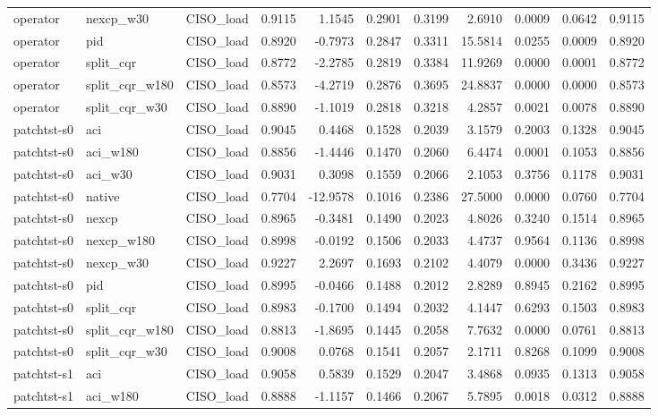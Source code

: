\begin{tabular}{lllrrrrrrrr}
operator & nexcp_w30 & CISO_load & 0.9115 & 1.1545 & 0.2901 & 0.3199 & 2.6910 & 0.0009 & 0.0642 & 0.9115 \\
operator & pid & CISO_load & 0.8920 & -0.7973 & 0.2847 & 0.3311 & 15.5814 & 0.0255 & 0.0009 & 0.8920 \\
operator & split_cqr & CISO_load & 0.8772 & -2.2785 & 0.2819 & 0.3384 & 11.9269 & 0.0000 & 0.0001 & 0.8772 \\
operator & split_cqr_w180 & CISO_load & 0.8573 & -4.2719 & 0.2876 & 0.3695 & 24.8837 & 0.0000 & 0.0000 & 0.8573 \\
operator & split_cqr_w30 & CISO_load & 0.8890 & -1.1019 & 0.2818 & 0.3218 & 4.2857 & 0.0021 & 0.0078 & 0.8890 \\
patchtst-s0 & aci & CISO_load & 0.9045 & 0.4468 & 0.1528 & 0.2039 & 3.1579 & 0.2003 & 0.1328 & 0.9045 \\
patchtst-s0 & aci_w180 & CISO_load & 0.8856 & -1.4446 & 0.1470 & 0.2060 & 6.4474 & 0.0001 & 0.1053 & 0.8856 \\
patchtst-s0 & aci_w30 & CISO_load & 0.9031 & 0.3098 & 0.1559 & 0.2066 & 2.1053 & 0.3756 & 0.1178 & 0.9031 \\
patchtst-s0 & native & CISO_load & 0.7704 & -12.9578 & 0.1016 & 0.2386 & 27.5000 & 0.0000 & 0.0760 & 0.7704 \\
patchtst-s0 & nexcp & CISO_load & 0.8965 & -0.3481 & 0.1490 & 0.2023 & 4.8026 & 0.3240 & 0.1514 & 0.8965 \\
patchtst-s0 & nexcp_w180 & CISO_load & 0.8998 & -0.0192 & 0.1506 & 0.2033 & 4.4737 & 0.9564 & 0.1136 & 0.8998 \\
patchtst-s0 & nexcp_w30 & CISO_load & 0.9227 & 2.2697 & 0.1693 & 0.2102 & 4.4079 & 0.0000 & 0.3436 & 0.9227 \\
patchtst-s0 & pid & CISO_load & 0.8995 & -0.0466 & 0.1488 & 0.2012 & 2.8289 & 0.8945 & 0.2162 & 0.8995 \\
patchtst-s0 & split_cqr & CISO_load & 0.8983 & -0.1700 & 0.1494 & 0.2032 & 4.1447 & 0.6293 & 0.1503 & 0.8983 \\
patchtst-s0 & split_cqr_w180 & CISO_load & 0.8813 & -1.8695 & 0.1445 & 0.2058 & 7.7632 & 0.0000 & 0.0761 & 0.8813 \\
patchtst-s0 & split_cqr_w30 & CISO_load & 0.9008 & 0.0768 & 0.1541 & 0.2057 & 2.1711 & 0.8268 & 0.1099 & 0.9008 \\
patchtst-s1 & aci & CISO_load & 0.9058 & 0.5839 & 0.1529 & 0.2047 & 3.4868 & 0.0935 & 0.1313 & 0.9058 \\
patchtst-s1 & aci_w180 & CISO_load & 0.8888 & -1.1157 & 0.1466 & 0.2067 & 5.7895 & 0.0018 & 0.0312 & 0.8888 \\

\end{tabular}
